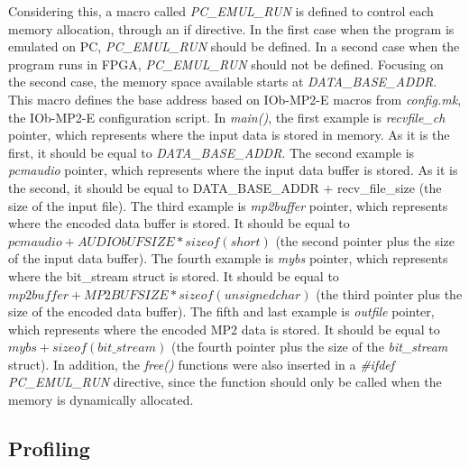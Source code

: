 Considering this, a macro called \textit{PC\_EMUL\_RUN} is defined to control each memory allocation, through an if directive. In the first case when the program is emulated on PC, \textit{PC\_EMUL\_RUN} should be defined. In a second case when the program runs in FPGA, \textit{PC\_EMUL\_RUN} should not be defined.
Focusing on the second case, the memory space available starts at \textit{DATA\_BASE\_ADDR}. This macro defines the base address based on IOb-MP2-E macros from \textit{config.mk}, the IOb-MP2-E configuration script.
In \textit{main()}, the first example is \textit{recvfile\_ch} pointer, which represents where the input data is stored in memory. As it is the first, it should be equal to \textit{DATA\_BASE\_ADDR}.
The second example is \textit{pcmaudio} pointer, which represents where the input data buffer is stored. As it is the second, it should be equal to DATA\_BASE\_ADDR + recv\_file\_size (the size of the input file).
The third example is \textit{mp2buffer} pointer, which represents where the encoded data buffer is stored. It should be equal to $pcmaudio + AUDIObUFSIZE*sizeof(short)$ (the second pointer plus the size of the input data buffer).
The fourth example is \textit{mybs} pointer, which represents where the bit\_stream struct is stored. It should be equal to $mp2buffer + MP2BUFSIZE*sizeof(unsigned char)$ (the third pointer plus the size of the encoded data buffer).
The fifth and last example is \textit{outfile} pointer, which represents where the encoded MP2 data is stored. It should be equal to $mybs + sizeof(bit\_stream)$ (the fourth pointer plus the size of the \textit{bit\_stream} struct).
In addition, the \textit{free()} functions were also inserted in a \textit{\#ifdef PC\_EMUL\_RUN} directive, since the function should only be called when the memory is dynamically allocated.  

\subsection{Profiling}

